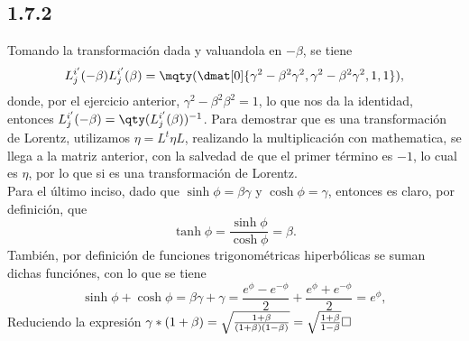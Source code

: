 \subsection{1.7.2}
Tomando la transformación dada y valuandola en $-\beta$, se tiene
	$$
		L^{i'} _j (-\beta) L^{i'} _j (\beta) = \mqty(\dmat[0]{\gamma ^2 - \beta ^2 \gamma ^2, \gamma ^2 - \beta ^2 \gamma ^2, 1, 1}),
	$$
	donde, por el ejercicio anterior, $\gamma ^2 - \beta ^2 \beta ^2 = 1$, lo que nos da la identidad, entonces $L ^{i'} _j (-\beta) = \qty(L ^{i'} _j (\beta))^{-1}$. Para demostrar que es una transformación de Lorentz, utilizamos $\eta = L^t \eta L$, realizando la multiplicación con mathematica, se llega a la matriz anterior, con la salvedad de que el primer término es $-1$, lo cual es $\eta$, por lo que si es una transformación de Lorentz. \\
Para el último inciso, dado que $\sinh{\phi} = \beta \gamma$ y $\cosh{\phi} = \gamma$, entonces es claro, por definición, que 
	$$\tanh{\phi} = \frac{\sinh{\phi}}{\cosh{\phi}} = \beta .$$
También, por definición de funciones trigonométricas hiperbólicas se suman dichas funciónes, con lo que se tiene
	$$\sinh{\phi} + \cosh{\phi} = \beta \gamma + \gamma = \frac{e^\phi - e^{-\phi}}{2} + \frac{e^\phi + e^{-\phi}}{2} = e^\phi ,$$
	Reduciendo la expresión $\gamma *(1 + \beta) = \sqrt{\frac{1 + \beta}{(1 + \beta)(1 - \beta)}} = \sqrt{\frac{1 + \beta}{1 - \beta}} \hfill \square$
	
